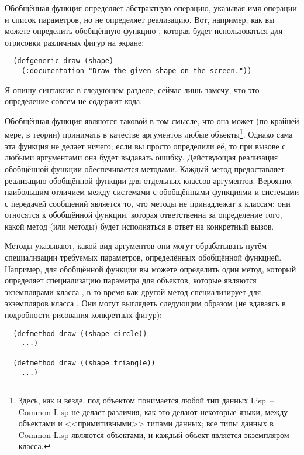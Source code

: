 Обобщённая функция определяет абстрактную операцию, указывая имя операции и список
параметров, но не определяет реализацию.  Вот, например, как вы можете определить
обобщённую функцию , которая будет использоваться для отрисовки различных фигур
на экране:

\begin{lstlisting}
  (defgeneric draw (shape)
    (:documentation "Draw the given shape on the screen."))
\end{lstlisting}

Я опишу синтаксис  в следующем разделе; сейчас лишь замечу, что это
определение совсем не содержит кода.

Обобщённая функция являются таковой в том смысле, что она может (по крайней мере, в теории)
принимать в качестве аргументов любые объекты\footnote{Здесь, как и везде, под объектом
  понимается любой тип данных Lisp~-- Common Lisp не делает различия, как это делают
  некоторые языки, между объектами и <<примитивными>> типами данных; все типы данных в
  Common Lisp являются объектами, и каждый объект является экземпляром класса.}.  Однако
сама эта функция не делает ничего; если вы просто определили её, то при вызове с любыми
аргументами она будет выдавать ошибку. Действующая реализация обобщённой функции
обеспечивается методами. Каждый метод предоставляет реализацию обобщённой функции для
отдельных классов аргументов.  Вероятно, наибольшим отличием между системами с обобщёнными
функциями и системами с передачей сообщений является то, что методы не принадлежат к
классам; они относятся к обобщённой функции, которая ответственна за определение того,
какой метод (или методы) будет исполняться в ответ на конкретный вызов.

Методы указывают, какой вид аргументов они могут обрабатывать путём специализации
требуемых параметров, определённых обобщённой функцией.  Например, для обобщённой функции
 вы можете определить один метод, который определяет специализацию параметра
 для объектов, которые являются экземплярами класса , в то время
как другой метод специализирует  для экземпляров класса .  Они
могут выглядеть следующим образом (не вдаваясь в подробности рисования конкретных фигур):

\begin{lstlisting}
  (defmethod draw ((shape circle))
    ...)

  (defmethod draw ((shape triangle))
    ...)
\end{lstlisting}

